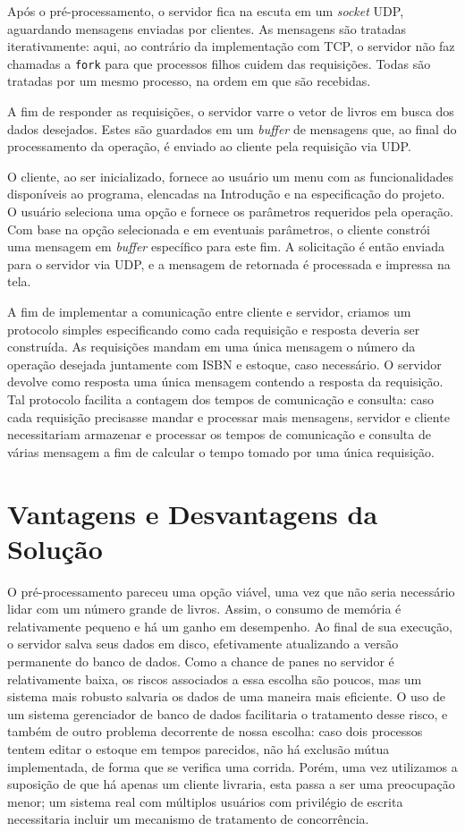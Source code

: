 \documentclass[11pt, brazil]{article} %
\begin{document}
Após o pré-processamento, o servidor fica na escuta em um \emph{socket} UDP, aguardando mensagens enviadas por clientes. As mensagens são tratadas iterativamente: aqui, ao contrário
da implementação com TCP, o servidor não faz chamadas a \texttt{fork} para que processos filhos cuidem das requisições. Todas são tratadas por um mesmo
processo, na ordem em que são recebidas.

A fim de responder as requisições, o servidor varre o vetor de livros em busca dos dados
desejados. Estes são guardados em um \emph{buffer} de mensagens que, ao
final do processamento da operação, é enviado ao cliente pela requisição via UDP.

O cliente, ao ser inicializado, fornece ao usuário um menu com as funcionalidades disponíveis
ao programa, elencadas na Introdução e na especificação do projeto. 
O usuário seleciona uma opção e fornece os parâmetros requeridos pela operação.
Com base na opção selecionada e em eventuais parâmetros, o cliente constrói uma mensagem em
\emph{buffer} específico para este fim. 
A solicitação é então enviada para o servidor via UDP, e a mensagem de retornada é processada
e impressa na tela.

A fim de implementar a comunicação entre cliente e servidor, criamos um protocolo simples
especificando como cada requisição e resposta deveria ser
construída. As requisições mandam em uma única mensagem o número da operação desejada
juntamente com ISBN e estoque, caso necessário. O servidor devolve
como resposta uma única mensagem contendo a resposta da requisição. Tal protocolo
facilita a contagem dos tempos de comunicação e consulta: caso cada requisição precisasse
mandar e processar mais mensagens, servidor e cliente necessitariam armazenar e processar os
tempos de comunicação e consulta de várias mensagem a fim de calcular o tempo tomado por
uma única requisição.

\section{Vantagens e Desvantagens da Solução}

O pré-processamento pareceu uma opção viável, uma vez que não seria necessário lidar com um
número grande de livros. Assim, o consumo de memória é relativamente pequeno e há um ganho em desempenho. 
Ao final de sua execução, o servidor salva seus dados em disco, efetivamente atualizando a versão permanente do banco de dados.
Como a chance de panes no servidor é relativamente baixa, os riscos associados a essa escolha são poucos, mas um sistema mais robusto salvaria os dados de uma maneira mais eficiente. 
O uso de um sistema gerenciador de banco de dados facilitaria o tratamento desse risco, e também de outro problema decorrente de nossa escolha: caso dois processos tentem editar o estoque em tempos parecidos, não há exclusão mútua implementada, de forma que se verifica uma corrida.
Porém, uma vez utilizamos a suposição de que há apenas um cliente livraria, esta passa a ser uma preocupação menor; um sistema real com múltiplos usuários
com privilégio de escrita necessitaria incluir um mecanismo de tratamento de concorrência.
\end{document}
